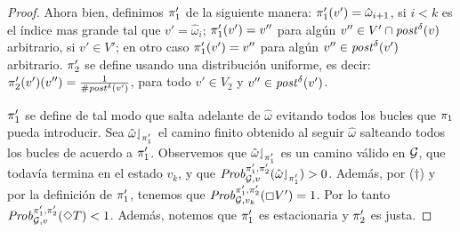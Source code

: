 \begin{proof}
  Ahora bien, definimos $\pi_{1}'$ de la siguiente manera:
  $\pi_{1}'(v') = \hat{\omega}_{i+1}$, si $i < k$ es el índice mas grande tal que $v' = \hat{\omega}_{i}$;
  $\pi_{1}'(v') = v''$ para algún $v'' \in
  V'\cap\mathit{post}^\delta(v)$ arbitrario, si $v' \in V'$;
  en otro caso $\pi_{1}'(v') = v''$ para algún
  $v'' \in \mathit{post}^\delta(v')$ arbitrario.
  $\pi_{2}'$ se define usando una distribución uniforme, es decir:
  $\pi_{2}'(v')(v'') = \frac{1}{\# \mathit{post}^\delta(v')}$, para todo $v'
  \in V_2$ y $v'' \in \mathit{post}^\delta(v')$.
  
  $\pi_{1}'$ se define de tal modo que salta adelante de $\hat{\omega}$
  evitando todos los bucles que $\pi_{1}$ pueda introducir.  Sea
  $\hat{\omega}{\downharpoonleft}_{\pi_{1}'}$ el camino finito obtenido al seguir $\hat{\omega}$ salteando todos los bucles de acuerdo a $\pi_{1}'$.
  Observemos que $\hat{\omega}{\downharpoonleft}_{\pi_{1}'}$ es un camino válido en $\mathcal{G}$, que todavía termina en el estado $v_k$, y que
  $\mathit{Prob}^{\pi_{1}',\pi_{2}'}_{\mathcal{G},v}({\hat{\omega}{\downharpoonleft}_{\pi_{1}'}})>0$.
  Además, por ($\dag$) y por la definición de $\pi_{1}'$, tenemos que $\mathit{Prob}^{\pi_{1}',\pi_{2}'}_{\mathcal{G}, v_k}(\Box V') = 1$.
  Por lo tanto $\mathit{Prob}^{\pi_{1}',\pi_{2}'}_{\mathcal{G}, v}(\Diamond T) < 1$.
  Además, notemos que $\pi_{1}'$ es estacionaria y $\pi_{2}'$
  es justa.
\qedhere
\end{proof}


